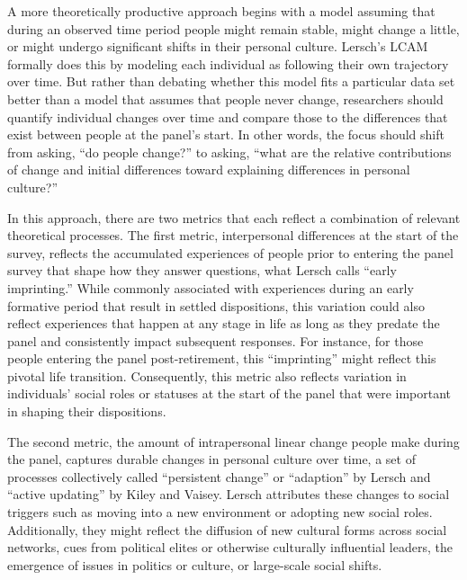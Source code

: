 \documentclass[
  12pt,
]{article}
\begin{document}
A more theoretically productive approach begins with a model assuming
that during an observed time period people might remain stable, might
change a little, or might undergo significant shifts in their personal
culture. Lersch's LCAM formally does this by modeling each individual as
following their own trajectory over time. But rather than debating
whether this model fits a particular data set better than a model that
assumes that people never change, researchers should quantify individual
changes over time and compare those to the differences that exist
between people at the panel's start. In other words, the focus should
shift from asking, ``do people change?'' to asking, ``what are the
relative contributions of change and initial differences toward
explaining differences in personal culture?''

In this approach, there are two metrics that each reflect a combination
of relevant theoretical processes. The first metric, interpersonal
differences at the start of the survey, reflects the accumulated
experiences of people prior to entering the panel survey that shape how
they answer questions, what Lersch calls ``early imprinting.'' While
commonly associated with experiences during an early formative period
that result in settled dispositions, this variation could also reflect
experiences that happen at any stage in life as long as they predate the
panel and consistently impact subsequent responses. For instance, for
those people entering the panel post-retirement, this ``imprinting''
might reflect this pivotal life transition. Consequently, this metric
also reflects variation in individuals' social roles or statuses at the
start of the panel that were important in shaping their dispositions.

The second metric, the amount of intrapersonal linear change people make
during the panel, captures durable changes in personal culture over
time, a set of processes collectively called ``persistent change'' or
``adaption'' by Lersch and ``active updating'' by Kiley and Vaisey.
Lersch attributes these changes to social triggers such as moving into a
new environment or adopting new social roles. Additionally, they might
reflect the diffusion of new cultural forms across social networks, cues
from political elites or otherwise culturally influential leaders, the
emergence of issues in politics or culture, or large-scale social
shifts.
\end{document}
